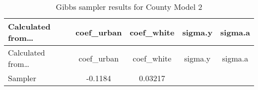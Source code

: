 \documentclass[12pt,twoside]{reedthesis}
\begin{document}
  \begin{longtable}[]{@{}lcccc@{}}
  \caption{Gibbs sampler results for County Model 2
  \label{tab:gibbs_2}}\tabularnewline
  \toprule
  \begin{minipage}[b]{0.25\columnwidth}\raggedright\strut
  Calculated from\ldots{}\strut
  \end{minipage} & \begin{minipage}[b]{0.16\columnwidth}\centering\strut
  coef\_urban\strut
  \end{minipage} & \begin{minipage}[b]{0.16\columnwidth}\centering\strut
  coef\_white\strut
  \end{minipage} & \begin{minipage}[b]{0.12\columnwidth}\centering\strut
  sigma.y\strut
  \end{minipage} & \begin{minipage}[b]{0.12\columnwidth}\centering\strut
  sigma.a\strut
  \end{minipage}\tabularnewline
  \midrule
  \endfirsthead
  \toprule
  \begin{minipage}[b]{0.25\columnwidth}\raggedright\strut
  Calculated from\ldots{}\strut
  \end{minipage} & \begin{minipage}[b]{0.16\columnwidth}\centering\strut
  coef\_urban\strut
  \end{minipage} & \begin{minipage}[b]{0.16\columnwidth}\centering\strut
  coef\_white\strut
  \end{minipage} & \begin{minipage}[b]{0.12\columnwidth}\centering\strut
  sigma.y\strut
  \end{minipage} & \begin{minipage}[b]{0.12\columnwidth}\centering\strut
  sigma.a\strut
  \end{minipage}\tabularnewline
  \midrule
  \endhead
  \begin{minipage}[t]{0.25\columnwidth}\raggedright\strut
  Sampler\strut
  \end{minipage} & \begin{minipage}[t]{0.16\columnwidth}\centering\strut
  -0.1184\strut
  \end{minipage} & \begin{minipage}[t]{0.16\columnwidth}\centering\strut
  0.03217\strut
  \end{minipage} & \begin{minipage}[t]{0.12\columnwidth}\centering\strut

\end{minipage}
\end{longtable}
\end{document}
